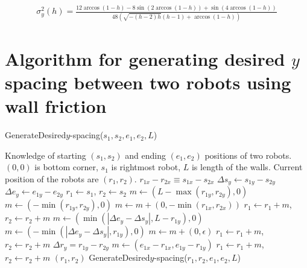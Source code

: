\documentclass[conference]{IEEEtran}
\begin{document}
{\tiny
\begin{align}
\sigma_y^2(h)=
\frac{12 \arccos(1-h)-8 \sin \left(2 \arccos(1-h)\right)+\sin \left(4 \arccos(1-h)\right)}{48 \left(\sqrt{-(h-2) h} (h-1)+\arccos(1-h)\right)}
\end{align}}

\section{ Algorithm for generating desired $y$ spacing between two robots using wall friction}
\begin{algorithm}
\caption{GenerateDesired$y$-spacing($s_1,s_2,e_1,e_2,L$)}\label{alg:YControl}
\begin{algorithmic}[1]
\Require Knowledge of starting $(s_1,s_2)$ and ending $(e_1,e_2)$ positions of  two robots. 
$(0,0)$ is bottom corner, $s_1$ is rightmost robot, 
 $L$ is length of the walls. Current position of the robots are $(r_1,r_2)$.
\Ensure   $ r_{1x} - r_{2x}  \equiv s_{1x} - s_{2x} $   %
\State $ \Delta s_y  \gets s_{1y} - s_{2y} $
\State $ \Delta e_y \gets e_{1y} - e_{2y} $
\State $ r_1 \gets s_1$, $ r_2 \gets s_2$
\State $ m \gets ( L-\max( r_{1y},r_{2y}) ,0)   $ 
\Else 
\State  $ m \gets ( -\min( r_{1y},r_{2y}),0 )    $ 
\EndIf
\State $m  \gets  m + (0, -\min( r_{1x},r_{2x} ))$ 
\State $ r_1 \gets r_1+m$, $ r_2 \gets r_2+m$ 
\State $ m \gets (\min(|\Delta e_y - \Delta s_y |, L- r_{1y}), 0)$  
\Else
\State $ m \gets (-\min(|\Delta e_y - \Delta s_y |, r_{1y}), 0)$
\EndIf 
\State $m  \gets  m + (0, \epsilon)$ 
\State $ r_1 \gets r_1+m$, $ r_2 \gets r_2+m$ 
\State $\Delta r_y = r_{1y} - r_{2y}$
\State   $ m \gets (e_{1x}-r_{1x}, e_{1y}-r_{1y})$
\State $ r_1 \gets r_1+m$, $ r_2 \gets r_2+m$ 
\State  \Return $(r_1,r_2)$
\Else   
\State \Return GenerateDesired$y$-spacing($r_1,r_2,e_1,e_2,L$)
\EndIf
\end{algorithmic}
\end{algorithm}



\end{document}
